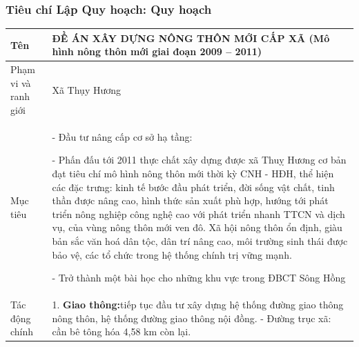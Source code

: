 \documentclass[../thesis.tex]{subfiles}
\begin{document}
\subsubsection {Tiêu chí Lập Quy hoạch: Quy hoạch}
\begin{landscape}
\begin{longtable}{ | m{3cm} | m{18cm}| } 
\hline
Tên &ĐỀ ÁN XÂY DỰNG NÔNG THÔN MỚI CẤP XÃ (Mô hình nông thôn mới giai đoạn 2009 – 2011) \\
\hline
Phạm vi và ranh giới &Xã Thụy Hương \\
\hline
Mục tiêu &- Đầu tư nâng cấp cơ sở hạ tầng: \par - Phấn đấu tới 2011 thực chất xây dựng được xã Thuỵ Hương cơ bản đạt tiêu chí mô hình nông thôn mới thời kỳ CNH - HĐH, thể hiện các đặc trưng: kinh tế bước đầu phát triển, đời sống vật chất, tinh thần được nâng cao, hình thức sản xuất phù hợp, hướng tới phát triển nông nghiệp công nghệ cao với phát triển nhanh TTCN và dịch vụ, của vùng nông thôn mới ven đô. Xã hội nông thôn ổn định, giàu bản sắc văn hoá dân tộc, dân trí nâng cao, môi trường sinh thái được bảo vệ, các tổ chức trong hệ thống chính trị vững mạnh. \par - Trở thành một bài học cho những khu vực trong ĐBCT Sông Hồng \\
\hline
Tác động chính & 1. \textbf{Giao thông:}tiếp tục đầu tư xây dựng hệ thống đường giao thông nông thôn, hệ thống đường giao thông nội đồng.
- Đường trục xã: cần bê tông hóa 4,58 km còn lại. 

\end{longtable}
\end{landscape}
\end{document}
